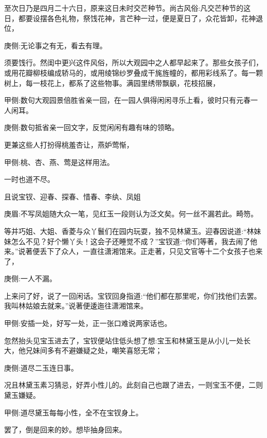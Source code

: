 \begin{parag}
    至次日乃是四月二十六日，原来这日未时交芒种节。尚古风俗:凡交芒种节的这日，都要设摆各色礼物，祭饯花神，言芒种一过，便是夏日了，众花皆卸，花神退位，\begin{note}庚侧:无论事之有无，看去有理。\end{note}须要饯行。然闺中更兴这件风俗，所以大观园中之人都早起来了。那些女孩子们，或用花瓣柳枝编成轿马的，或用绫锦纱罗叠成干旄旌幢的，都用彩线系了。每一颗树上，每一枝花上，都系了这些物事。满园里绣带飘飖，花枝招展，\begin{note}甲侧:数句大观园景倍胜省亲一回，在一园人俱得闲闲寻乐上看，彼时只有元春一人闲耳。\end{note}\begin{note}庚侧:数句抵省亲一回文字，反觉闲闲有趣有味的领略。\end{note}更兼这些人打扮得桃羞杏让，燕妒莺惭，\begin{note}甲侧:桃、杏、燕、莺是这样用法。\end{note}一时也道不尽。
\end{parag}


\begin{parag}
    且说宝钗、迎春、探春、惜春、李纨、凤姐\begin{note}庚眉:不写凤姐随大众一笔，见红玉一段则认为泛文矣。何一丝不漏若此。畸笏。\end{note}等并巧姐、大姐、香菱与众丫鬟们在园内玩耍，独不见林黛玉。迎春因说道:“林妹妹怎么不见？好个懒丫头！这会子还睡觉不成？”宝钗道:“你们等著，我去闹了他来。”说著便丢下了众人，一直往潇湘馆来。正走著，只见文官等十二个女孩子也来了，\begin{note}庚侧:一人不漏。\end{note}上来问了好，说了一回闲话。宝钗回身指道:“他们都在那里呢，你们找他们去罢。我叫林姑娘去就来。”说著便逶迤往潇湘馆来。\begin{note}甲侧:安插一处，好写一处，正一张口难说两家话也。\end{note}忽然抬头见宝玉进去了，宝钗便站住低头想了想:宝玉和林黛玉是从小儿一处长大，他兄妹间多有不避嫌疑之处，嘲笑喜怒无常；\begin{note}庚侧:道尽二玉连日事。\end{note}况且林黛玉素习猜忌，好弄小性儿的。此刻自己也跟了进去，一则宝玉不便，二则黛玉嫌疑。\begin{note}甲侧:道尽黛玉每每小性，全不在宝钗身上。\end{note}罢了，倒是回来的妙。想毕抽身回来。
\end{parag}


